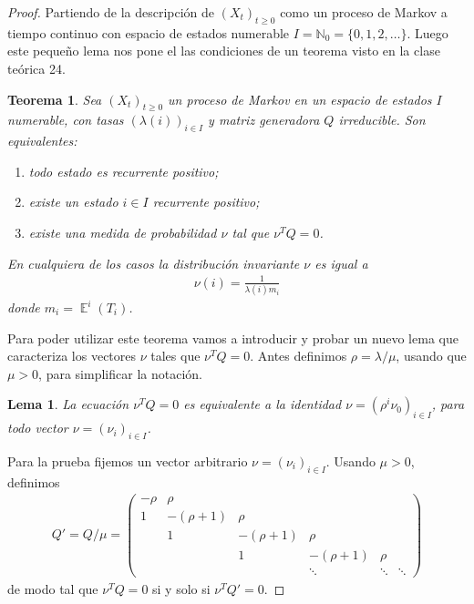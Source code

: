 \documentclass{article}
\DeclareMathOperator{\Exp}{\mathbb{E}}
\newcommand{\naturalnum}{\mathbb{N}}
\newtheorem{theorem}{Teorema}
\newtheorem{lemma}{Lema}
\theoremstyle{definition}
\begin{document}
\begin{proof}
Partiendo de la descripción de \((X_t)_{t \geq 0}\) como un proceso de Markov a tiempo continuo con espacio de estados numerable \(I =  \naturalnum_0 = \{0, 1, 2, \dots\}\).
Luego este pequeño lema nos pone el las condiciones de un teorema visto en la clase teórica 24.

\begin{theorem}
\label{theorem:PositiveRecurrentMarkovProcesses}
Sea \((X_t)_{t \geq 0}\) un proceso de Markov en un espacio de estados \(I\) numerable, con tasas \((\lambda(i))_{i \in I}\) y matriz generadora \(Q\) irreducible.
Son equivalentes:
\begin{enumerate}
	\item todo estado es recurrente positivo;
	\item existe un estado \(i \in I\) recurrente positivo;
	\item existe una medida de probabilidad \(\nu\) tal que \(\nu^{T} Q = 0\).
\end{enumerate}
En cualquiera de los casos la distribución invariante \(\nu\) es igual a
\begin{align}
	\nu(i) = \frac{1}{\lambda(i) m_i}
\end{align}
donde \(m_i = \Exp^i(T_i)\).
\end{theorem}

Para poder utilizar este teorema vamos a introducir y probar un nuevo lema que caracteriza los vectores \(\nu\) tales que \(\nu^T Q = 0\).
Antes definimos \(\rho = \lambda / \mu\), usando que \(\mu > 0\), para simplificar la notación.
\begin{lemma}
\label{lemma:LeftNullspaceOfGeneratorMatrix}
La ecuación \(\nu^T Q = 0\) es equivalente a la identidad \(\nu = (\rho^i \nu_0)_{i \in I}\), para todo vector \(\nu = (\nu_i)_{i \in I}\).
\end{lemma}
Para la prueba fijemos un vector arbitrario \(\nu = (\nu_i)_{i \in I}\).
Usando \(\mu > 0\), definimos
\begin{align}
	Q'
	=
	Q / \mu
	=
	\begin{pmatrix}
		- \rho &\rho \\
		1 &- (\rho + 1) &\rho \\
		 &1 &- (\rho + 1) &\rho \\
		 & &1 &- (\rho + 1) &\rho \\
		 & & &\ddots &\ddots &\ddots
	\end{pmatrix}
\end{align}
de modo tal que \(\nu^T Q = 0\) si y solo si \(\nu^T Q' = 0\).


\end{proof}
\end{document}

